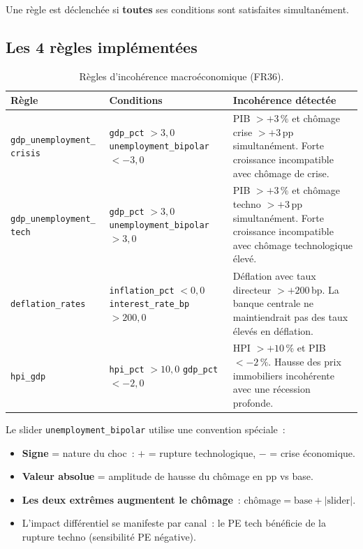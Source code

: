 \documentclass[12pt,a4paper]{article}
\begin{document}
Une r\`egle est d\'eclench\'ee si \textbf{toutes} ses conditions sont satisfaites simultan\'ement.

\subsection{Les 4 r\`egles impl\'ement\'ees}

\begin{table}[h]
\centering
\small
\begin{tabular}{p{3.5cm}p{4.5cm}p{5cm}}
\toprule
\textbf{R\`egle} & \textbf{Conditions} & \textbf{Incoh\'erence d\'etect\'ee} \\
\midrule
\texttt{gdp\_unemployment\_ crisis} &
    \texttt{gdp\_pct} $> 3{,}0$ \newline \texttt{unemployment\_bipolar} $< -3{,}0$ &
    PIB $> +3\,\%$ et ch\^omage crise $> +3$\,pp simultan\'ement. Forte croissance incompatible avec ch\^omage de crise. \\
\midrule
\texttt{gdp\_unemployment\_ tech} &
    \texttt{gdp\_pct} $> 3{,}0$ \newline \texttt{unemployment\_bipolar} $> 3{,}0$ &
    PIB $> +3\,\%$ et ch\^omage techno $> +3$\,pp simultan\'ement. Forte croissance incompatible avec ch\^omage technologique \'elev\'e. \\
\midrule
\texttt{deflation\_rates} &
    \texttt{inflation\_pct} $< 0{,}0$ \newline \texttt{interest\_rate\_bp} $> 200{,}0$ &
    D\'eflation avec taux directeur $> +200$\,bp. La banque centrale ne maintiendrait pas des taux \'elev\'es en d\'eflation. \\
\midrule
\texttt{hpi\_gdp} &
    \texttt{hpi\_pct} $> 10{,}0$ \newline \texttt{gdp\_pct} $< -2{,}0$ &
    HPI $> +10\,\%$ et PIB $< -2\,\%$. Hausse des prix immobiliers incoh\'erente avec une r\'ecession profonde. \\
\bottomrule
\end{tabular}
\caption{R\`egles d'incoh\'erence macro\'economique (FR36).}
\label{tab:incoherence_rules}
\end{table}

\begin{warningbox}
Le slider \texttt{unemployment\_bipolar} utilise une convention sp\'eciale~:
\begin{itemize}[nosep]
    \item \textbf{Signe} = nature du choc~: $+$ = rupture technologique, $-$ = crise \'economique.
    \item \textbf{Valeur absolue} = amplitude de hausse du ch\^omage en pp vs base.
    \item \textbf{Les deux extr\^emes augmentent le ch\^omage}~: $\text{ch\^omage} = \text{base} + |\text{slider}|$.
    \item L'impact diff\'erentiel se manifeste par canal~: le PE tech b\'en\'eficie de la rupture techno (sensibilit\'e PE n\'egative).
\end{itemize}
\end{warningbox}
\end{document}
